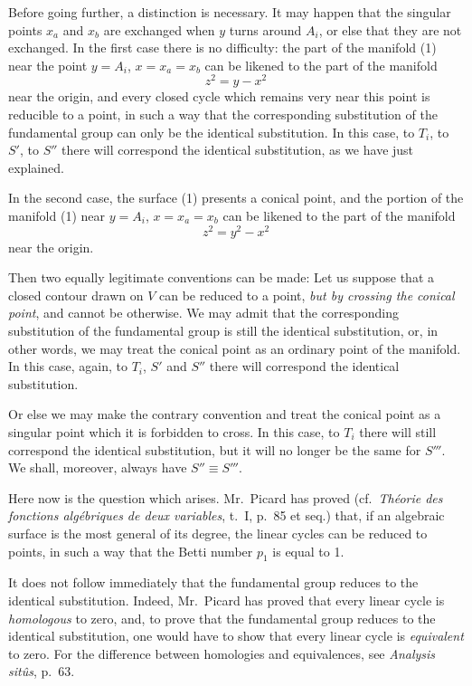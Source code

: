 \documentclass{article}
\begin{document}
Before going further, a distinction is necessary. It may happen that the singular points $x_{a}$ and $x_{b}$ are exchanged when $y$ turns around $A_{i}$, or else that they are not exchanged. In the first case there is no difficulty: the part of the manifold (1) near the point $y = A_{i}$, $x = x_{a} = x_{b}$ can be likened to the part of the manifold
\[ z^{2} = y - x^{2} \]
near the origin, and every closed cycle which remains very near this point is reducible to a point, in such a way that the corresponding substitution of the fundamental group can only be the identical substitution. In this case, to $T_{i}$, to $S'$, to $S''$ there will correspond the identical substitution, as we have just explained.


In the second case, the surface (1) presents a conical point, and the portion of the manifold (1) near $y = A_{i}$, $x = x_{a} = x_{b}$ can be likened to the part of the manifold
\[ z^{2} = y^{2} - x^{2} \]
near the origin.

Then two equally legitimate conventions can be made: Let us suppose that a closed contour drawn on $V$ can be reduced to a point, \emph{but by crossing the conical point}, and cannot be otherwise. We may admit that the corresponding substitution of the fundamental group is still the identical substitution, or, in other words, we may treat the conical point as an ordinary point of the manifold. In this case, again, to $T_{i}$, $S'$ and $S''$ there will correspond the identical substitution.

Or else we may make the contrary convention and treat the conical point as a singular point which it is forbidden to cross. In this case, to $T_{i}$ there will still correspond the identical substitution, but it will no longer be the same for $S'''$. We shall, moreover, always have $S'' \equiv S'''$.

Here now is the question which arises. Mr.~Picard has proved (cf.\ \emph{Théorie des fonctions algébriques de deux variables}, t.\ I, p.\ 85 et seq.) that, if an algebraic surface is the most general of its degree, the linear cycles can be reduced to points, in such a way that the Betti number $p_{1}$ is equal to 1.

It does not follow immediately that the fundamental group reduces to the identical substitution. Indeed, Mr.~Picard has proved that every linear cycle is \emph{homologous} to zero, and, to prove that the fundamental group reduces to the identical substitution, one would have to show that every linear cycle is \emph{equivalent} to zero. For the difference between homologies and equivalences, see \emph{Analysis sitûs}, p.\ 63.
\end{document}
